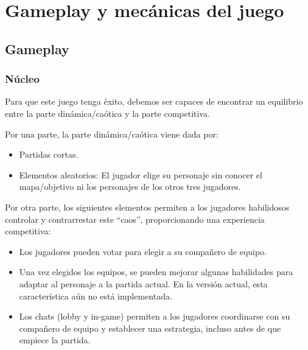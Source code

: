 \chapter{Gameplay y mecánicas del juego}


\section{Gameplay}
\subsection{Núcleo}

Para que este juego tenga éxito, debemos ser capaces de encontrar un equilibrio entre la parte dinámica/caótica y la parte competitiva.

\vspace{\baselineskip}

Por una parte, la parte dinámica/caótica viene dada por:
\begin{itemize}
  \item Partidas cortas.
  \item Elementos aleatorios: El jugador elige su personaje sin conocer el mapa/objetivo ni los personajes de los otros tres jugadores.
\end{itemize}

\vspace{\baselineskip}

Por otra parte, los siguientes elementos permiten a los jugadores habilidosos controlar y contrarrestar este ``caos'', proporcionando una experiencia competitiva: 
\begin{itemize}
  \item Los jugadores pueden votar para elegir a su compañero de equipo.
  \item Una vez elegidos los equipos, se pueden mejorar algunas habilidades para adaptar al personaje a la partida actual. En la versión actual, esta característica aún no está implementada.
  \item Los chats (lobby y in-game) permiten a los jugadores coordinarse con su compañero de equipo y establecer una estrategia, incluso antes de que empiece la partida.
\end{itemize}


